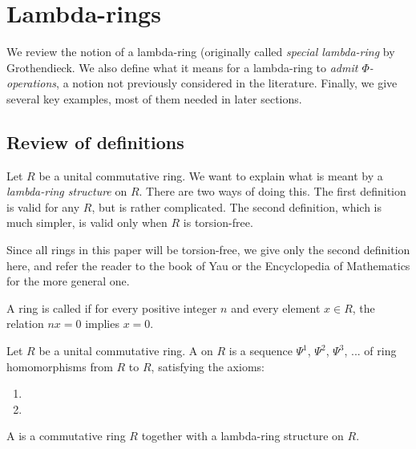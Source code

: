 
\section{Lambda-rings}

We review the notion of a lambda-ring (originally called \emph{special lambda-ring} by Grothendieck. We also define what it means for a lambda-ring to \emph{admit $\Phi$-operations}, a notion not previously considered in the literature. Finally, we give several key examples, most of them needed in later sections.


\subsection{Review of definitions}

Let $R$ be a unital commutative ring. We want to explain what is meant by a \emph{lambda-ring structure} on $R$. There are two ways of doing this. The first definition is valid for any $R$, but is rather complicated. The second definition, which is much simpler, is valid only when $R$ is torsion-free.

Since all rings in this paper will be torsion-free, we give only the second definition here, and refer the reader to the book of Yau \cite{Yau} or the Encyclopedia of Mathematics for the more general one.

\begin{definition}
A ring is called  if for every positive integer $n$ and every element $x \in R$, the relation $nx=0$ implies $x=0$.
\end{definition}

\begin{definition}
Let $R$ be a unital commutative ring. A  on $R$ is a sequence $\Psi^1$, $\Psi^2$, $\Psi^3$, ... of ring homomorphisms from $R$ to $R$, satisfying the axioms:
\begin{enumerate}
\item
\item
\end{enumerate}

\end{definition}

\begin{definition}
A  is a commutative ring $R$ together with a lambda-ring structure on $R$.
\end{definition}

